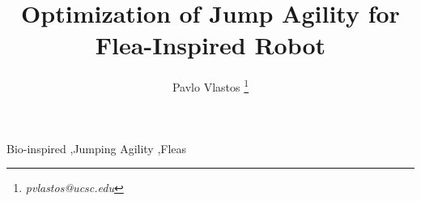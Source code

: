 \documentclass[preprint,authoryear,12pt] {elsarticle}
\begin{document}
\begin{frontmatter}

\title{Optimization of Jump Agility for Flea-Inspired Robot} 

\author{Pavlo Vlastos \footnote{\textit{pvlastos@ucsc.edu}}}

\address{Baskin School of Engineering, UC Santa Cruz}

%
%
\begin{abstract} 
%
%
%
\end{abstract}

\begin{keyword}
Bio-inspired \sep Jumping Agility \sep Fleas 
\end{keyword}

\end{frontmatter}



 	
 
 		
 	





\end{document}
